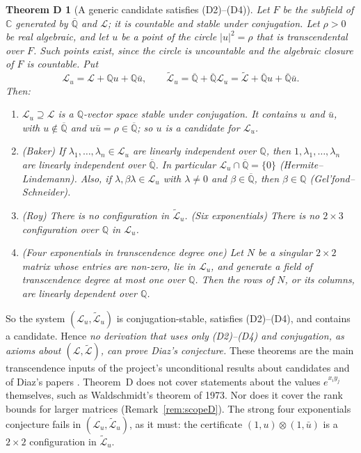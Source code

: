 \documentclass[11pt,a4paper]{article}
\theoremstyle{plain}
\newtheorem*{theoremD}{Theorem D}
\theoremstyle{definition}
\newcommand{\C}{\mathbb{C}}
\newcommand{\Q}{\mathbb{Q}}
\newcommand{\Qbar}{\overline{\mathbb{Q}}}
\newcommand{\cL}{\mathcal{L}}
\newcommand{\Lt}{\widetilde{\mathcal{L}}}
\begin{document}
\begin{theoremD}[A generic candidate satisfies (D2)--(D4)]
Let $F$ be the subfield of $\C$ generated by $\Qbar$ and $\cL$; it is countable and stable
under conjugation. Let $\rho>0$ be real algebraic, and let $u$ be a point of the circle
$|u|^{2}=\rho$ that is transcendental over $F$. Such points exist, since the circle is
uncountable and the algebraic closure of $F$ is countable. Put
\[
  \cL_{u}=\cL+\Q u+\Q\bar u,\qquad \Lt_{u}=\Qbar+\Qbar\cL_{u}=\Lt+\Qbar u+\Qbar\bar u .
\]
Then:
\begin{enumerate}[label=\textup{(D\arabic*)}]
\item $\cL_{u}\supseteq\cL$ is a $\Q$-vector space stable under conjugation. It contains
$u$ and $\bar u$, with $u\notin\Qbar$ and $u\bar u=\rho\in\Qbar$; so $u$ is a candidate for
$\cL_{u}$.
\item \emph{(Baker)} If $\lambda_{1},\dots,\lambda_{n}\in\cL_{u}$ are linearly independent
over $\Q$, then $1,\lambda_{1},\dots,\lambda_{n}$ are linearly independent over $\Qbar$.
In particular $\cL_{u}\cap\Qbar=\{0\}$ (Hermite--Lindemann). Also, if
$\lambda,\beta\lambda\in\cL_{u}$ with $\lambda\neq0$ and $\beta\in\Qbar$, then $\beta\in\Q$
(Gel'fond--Schneider).
\item \emph{(Roy)} There is no configuration in $\Lt_{u}$. \emph{(Six exponentials)} There
is no $2\times3$ configuration over $\Q$ in $\cL_{u}$.
\item \emph{(Four exponentials in transcendence degree one)} Let $N$ be a singular
$2\times2$ matrix whose entries are non-zero, lie in $\cL_{u}$, and generate a field of
transcendence degree at most one over $\Q$. Then the rows of $N$, or its columns, are
linearly dependent over $\Q$.
\end{enumerate}
\end{theoremD}

So the system $(\cL_{u},\Lt_{u})$ is conjugation-stable, satisfies (D2)--(D4), and
contains a candidate. Hence \emph{no derivation that uses only (D2)--(D4) and
conjugation, as axioms about $(\cL,\Lt)$, can prove Diaz's conjecture.} These theorems
are the main transcendence inputs of the project's unconditional results about
candidates and of Diaz's papers \cite{Dia04,Dia07}. Theorem~D does not cover statements
about the values $e^{x_{i}y_{j}}$ themselves, such as Waldschmidt's theorem of 1973. Nor
does it cover the rank bounds for larger matrices (Remark~\ref{rem:scopeD}). The strong
four exponentials conjecture fails in $(\cL_{u},\Lt_{u})$, as it must: the certificate
$(1,u)\otimes(1,\bar u)$ is a $2\times2$ configuration in $\Lt_{u}$.
\end{document}
